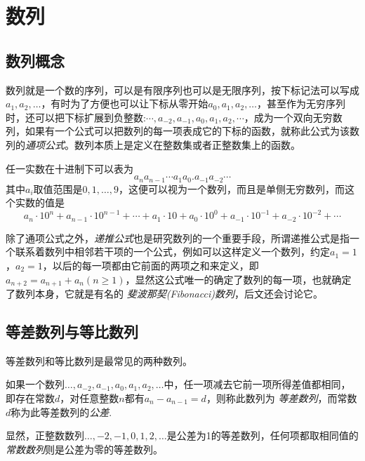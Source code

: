 
\section{数列}
\label{sec:number-sequence-general}

\subsection{数列概念}

数列就是一个数的序列，可以是有限序列也可以是无限序列，按下标记法可以写成$a_1,a_2,\ldots$，有时为了方便也可以让下标从零开始$a_0,a_1,a_2,\ldots$，甚至作为无穷序列时，还可以把下标扩展到负整数:$\cdots,a_{-2},a_{-1},a_0,a_1,a_2,\cdots$，成为一个双向无穷数列，如果有一个公式可以把数列的每一项表成它的下标的函数，就称此公式为该数列的\emph{通项公式}。数列本质上是定义在整数集或者正整数集上的函数。

\begin{example}
  任一实数在十进制下可以表为
  \[ a_na_{n-1}\cdots a_1a_0.a_{-1}a_{-2}\cdots \]
  其中$a_i$取值范围是$0,1,\ldots,9$，这便可以视为一个数列，而且是单侧无穷数列，而这个实数的值是
  \[ a_n\cdot 10^n + a_{n-1} \cdot 10^{n-1} + \cdots + a_1 \cdot 10 + a_0 \cdot 10^0 + a_{-1} \cdot 10^{-1} + a_{-2} \cdot 10^{-2} +\cdots \]
\end{example}

除了通项公式之外，\emph{递推公式}也是研究数列的一个重要手段，所谓递推公式是指一个联系着数列中相邻若干项的一个公式，例如可以这样定义一个数列，约定$a_1=1$，$a_2=1$，以后的每一项都由它前面的两项之和来定义，即$a_{n+2}=a_{n+1}+a_n(n \geqslant 1)$，显然这公式唯一的确定了数列的每一项，也就确定了数列本身，它就是有名的 \emph{斐波那契(Fibonacci)数列}，后文还会讨论它。

\subsection{等差数列与等比数列}

等差数列和等比数列是最常见的两种数列。

\begin{definition}
 如果一个数列$\ldots,a_{-2},a_{-1},a_0,a_1,a_2,\ldots$中，任一项减去它前一项所得差值都相同，即存在常数$d$，对任意整数$n$都有$a_n-a_{n-1}=d$，则称此数列为 \emph{等差数列}，而常数$d$称为此等差数列的\emph{公差}.
\end{definition}

显然，正整数数列$\ldots,-2,-1,0,1,2,\ldots$是公差为1的等差数列，任何项都取相同值的\emph{常数数列}则是公差为零的等差数列。

